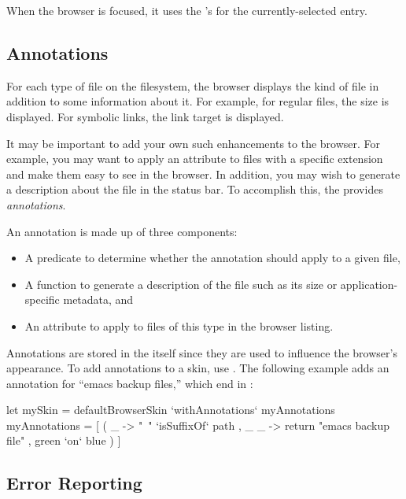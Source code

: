 When the browser is focused, it uses the 's
 for the currently-selected entry.

\subsection{Annotations}

For each type of file on the filesystem, the browser displays the kind
of file in addition to some information about it.  For example, for
regular files, the size is displayed.  For symbolic links, the link
target is displayed.

It may be important to add your own such enhancements to the browser.
For example, you may want to apply an attribute to files with a
specific extension and make them easy to see in the browser.  In
addition, you may wish to generate a description about the file in the
status bar.  To accomplish this, the  provides
\textit{annotations}.

An annotation is made up of three components:

\begin{itemize}
\item A predicate to determine whether the annotation should apply to
  a given file,
\item A function to generate a description of the file such as its
  size or application-specific metadata, and
\item An attribute to apply to files of this type in the browser
  listing.
\end{itemize}

Annotations are stored in the  itself since they are
used to influence the browser's appearance.  To add annotations to a
skin, use .  The following example adds an
annotation for ``emacs backup files,'' which end in :

\begin{haskellcode}
 let mySkin = defaultBrowserSkin `withAnnotations` myAnnotations
     myAnnotations = [ ( \path _ -> "~" `isSuffixOf` path
                       , \_ _ -> return "emacs backup file"
                       , green `on` blue
                       )
                     ]
\end{haskellcode}

\subsection{Error Reporting}

